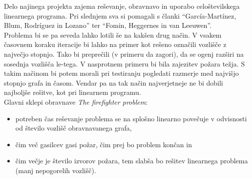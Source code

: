 \documentclass[a4paper, 12pt]{article}
\begin{document}
\noindent Delo najinega projekta zajema reševanje, obravnavo in uporabo celoštevilskega linearnega programa. 
Pri slednjem sva si pomagali s članki ``García-Martínez, Blum, Rodríguez in Lozano''\cite{garcia2015} ter
``Fomin, Heggernes in van Leeuwen''\cite{fomin2015}. \\
Problema bi se pa seveda lahko lotili še
na kakšen drug način. V vsakem časovnem koraku iteracije bi lahko na primer kot rešeno označili vozlišče z 
največjo stopnjo. Tako bi preprečili (v primeru da zagori), da se ogenj razširi na sosednja vozlišča
le-tega. V nasprotnem primeru bi bila zajezitev požara težja. 
S takim načinom bi potem morali pri testiranju pogledati razmerje med najvišjo stopnjo 
grafa in časom. Vendar pa na tak način najverjetneje ne bi dobili najboljše
rešitve, kot pri linearnem programu. \\

\noindent Glavni sklepi obravnave \emph{The firefighter problem}:
\begin{itemize}
    \item potreben čas reševanje problema se na splošno linearno povečuje
            v odvisnosti od število vozlišč obravnavanega grafa,
    \item čim več gasilcev gasi požar, čim prej bo problem končan in
    \item čim večje je število izvorov požara, tem slabša bo rešitev linearnega problema 
        (manj nepogorelih vozlišč).
\end{itemize}

\pagebreak
 



\end{document}
